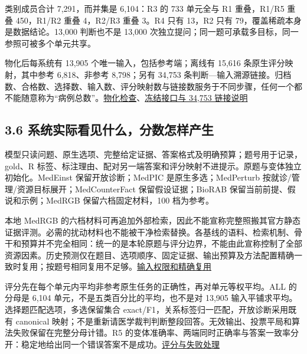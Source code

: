 \documentclass[
  11pt,
  a4paper,
]{article}
\begin{document}
类别成员合计 7,291，而并集是 6,104：R3 的 733 单元全与 R1 重叠，R1/R5
重叠 450，R1/R2 重叠 4，R2/R3 重叠 3。R4 只有 13，R2 只有
79，覆盖稀疏本身是数据结论。13,000 判断也不是 13,000
次独立提问；同一题可承载多目标，同一参照可被多个单元共享。

物化后每系统有 13,905 个唯一输入，包括参考端；离线有 15,616
条原生评分映射，其中参考 6,818、非参考 8,798；另有 34,753
条判断---输入溯源链接。归档数、合格数、选择数、输入数、评分映射数与链接数服务于不同步骤，任何一个都不能随意称为``病例总数''。\href{https://github.com/xiotakut/cf_mrg/blob/main/papers/2026-10-02_cf_moa/author_dossier/sources/00969e589c3a_preparation_validation.json}{物化检查}、\href{https://github.com/xiotakut/cf_mrg/blob/main/papers/2026-10-02_cf_moa/author_dossier/records/evaluation/protocol.md\#L156}{冻结接口与
34,753 链接说明}

\subsection{3.6
系统实际看见什么，分数怎样产生}\label{ux7cfbux7edfux5b9eux9645ux770bux89c1ux4ec0ux4e48ux5206ux6570ux600eux6837ux4ea7ux751f}

模型只读问题、原生选项、完整给定证据、答案格式及明确预算；题号用于记录，gold、R
标签、标注理由、配对另一端答案和评分映射不进提示。原题与变体独立初始化。MedEinst
保留开放诊断；MedPIC 是原生多选；MedPerturb
按就诊/管理/资源目标展开；MedCounterFact 保留假设证据；BioRAB
保留当前前提、假说和示例；MedRGB 保留六档固定材料，100 档为参考。

本地 MedRGB
的六档材料可再追加外部检索，因此不能宣称完整照搬其官方静态证据评测。必需的扰动材料也不能被干净检索替换。各基线的语料、检索机制、骨干和预算并不完全相同：统一的是本轮原题与评分边界，不能由此宣称控制了全部资源因素。历史预测仅在题目、选项顺序、固定证据、输出预算及方法配置精确一致时复用；按题号相同复用不足够。\href{https://github.com/xiotakut/cf_mrg/blob/main/papers/2026-10-02_cf_moa/author_dossier/records/evaluation/protocol.md\#L37}{输入权限和精确复用}

评分先在每个单元内平均非参考原生任务的正确性，再对单元等权平均。ALL
的分母是 6,104 单元，不是五类百分比的平均，也不是对 13,905
输入平铺求平均。选择题匹配选项，多选保留集合
exact/F1，关系标签归一匹配，开放诊断采用既有 canonical
映射；不是重新请医学裁判判断整段回答。无效输出、投票平局和算法失败保留在完整分母计错。R5
的变体准确率、两端同时正确率与答案一致率分开：稳定地给出同一个错误答案不是成功。\href{https://github.com/xiotakut/cf_mrg/blob/main/papers/2026-10-02_cf_moa/author_dossier/records/evaluation/protocol.md\#L67}{评分与失败处理}
\end{document}
